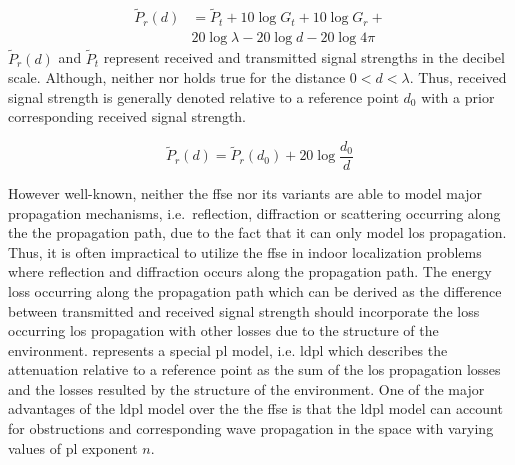     \begin{equation}
      \begin{split}
        \label{eq:friisdBm}
        \widetilde{P}_r(d) &= \widetilde{P}_t + 10 \log{G_t} + 10 \log{G_r} + \\
        & 20 \log{\lambda} - 20 \log{d} - 20 \log{4 \pi}
      \end{split}
    \end{equation}
    $\widetilde{P}_r(d)$ and $\widetilde{P}_t$ represent received and transmitted signal strengths in the decibel scale.
    Although, neither  nor  holds true for the distance $0<d<\lambda$.
    Thus, received signal strength is generally denoted relative to a reference point $d_0$ with a prior corresponding received signal strength.

    \begin{equation}
        \label{eq:friisRef}
        \widetilde{P}_r(d) = \widetilde{P}_r(d_0) + 20 \log{\dfrac{d_0}{d}}
    \end{equation}


    However well-known, neither the \gls{ffse} nor its variants are able to model major propagation mechanisms, i.e.\ reflection, diffraction or scattering occurring along the the propagation path, due to the fact that it can only model \gls{los} propagation.
    Thus, it is often impractical to utilize the \gls{ffse} in indoor localization problems where reflection and diffraction occurs along the propagation path.
    The energy loss occurring along the propagation path which can be derived as the difference between transmitted and received signal strength should incorporate the loss occurring \gls{los} propagation with other losses due to the structure of the environment.
     represents a special \gls{pl} model, i.e. \gls{ldpl} which describes the attenuation relative to a reference point as the sum of the \gls{los} propagation losses and the losses resulted by the structure of the environment.
    One of the major advantages of the \gls{ldpl} model over the the \gls{ffse} is that the \gls{ldpl} model can account for obstructions and corresponding wave propagation in the space with varying values of \gls{pl} exponent $n$.

